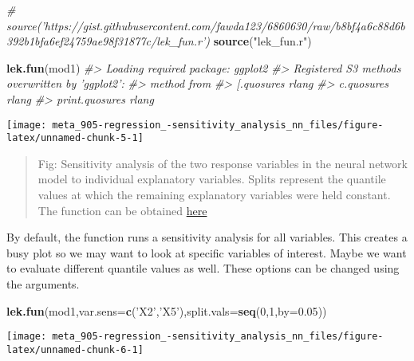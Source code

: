 \documentclass[]{book}
\newenvironment{Shaded}{\begin{snugshade}}{\end{snugshade}}
\newcommand{\CommentTok}[1]{\textcolor[rgb]{0.56,0.35,0.01}{\textit{#1}}}
\newcommand{\DataTypeTok}[1]{\textcolor[rgb]{0.13,0.29,0.53}{#1}}
\newcommand{\DecValTok}[1]{\textcolor[rgb]{0.00,0.00,0.81}{#1}}
\newcommand{\FloatTok}[1]{\textcolor[rgb]{0.00,0.00,0.81}{#1}}
\newcommand{\KeywordTok}[1]{\textcolor[rgb]{0.13,0.29,0.53}{\textbf{#1}}}
\newcommand{\NormalTok}[1]{#1}
\newcommand{\StringTok}[1]{\textcolor[rgb]{0.31,0.60,0.02}{#1}}
\begin{document}
\begin{Shaded}
\begin{Highlighting}[]
\CommentTok{# source('https://gist.githubusercontent.com/fawda123/6860630/raw/b8bf4a6c88d6b392b1bfa6ef24759ae98f31877c/lek_fun.r')}
\KeywordTok{source}\NormalTok{(}\StringTok{"lek_fun.r"}\NormalTok{)}

\KeywordTok{lek.fun}\NormalTok{(mod1)}
\CommentTok{#> Loading required package: ggplot2}
\CommentTok{#> Registered S3 methods overwritten by 'ggplot2':}
\CommentTok{#>   method         from }
\CommentTok{#>   [.quosures     rlang}
\CommentTok{#>   c.quosures     rlang}
\CommentTok{#>   print.quosures rlang}
\end{Highlighting}
\end{Shaded}

\begin{center}\texttt{[image: meta\_905-regression\_-sensitivity\_analysis\_nn\_files/figure-latex/unnamed-chunk-5-1]} \end{center}

\begin{quote}
Fig: Sensitivity analysis of the two response variables in the neural network model to individual explanatory variables. Splits represent the quantile values at which the remaining explanatory variables were held constant. The function can be obtained \href{https://gist.githubusercontent.com/fawda123/6860630/raw/b8bf4a6c88d6b392b1bfa6ef24759ae98f31877c/lek_fun.r}{here}
\end{quote}

By default, the function runs a sensitivity analysis for all variables. This creates a busy plot so we may want to look at specific variables of interest. Maybe we want to evaluate different quantile values as well. These options can be changed using the arguments.

\begin{Shaded}
\begin{Highlighting}[]
\KeywordTok{lek.fun}\NormalTok{(mod1,}\DataTypeTok{var.sens=}\KeywordTok{c}\NormalTok{(}\StringTok{'X2'}\NormalTok{,}\StringTok{'X5'}\NormalTok{),}\DataTypeTok{split.vals=}\KeywordTok{seq}\NormalTok{(}\DecValTok{0}\NormalTok{,}\DecValTok{1}\NormalTok{,}\DataTypeTok{by=}\FloatTok{0.05}\NormalTok{))}
\end{Highlighting}
\end{Shaded}

\begin{center}\texttt{[image: meta\_905-regression\_-sensitivity\_analysis\_nn\_files/figure-latex/unnamed-chunk-6-1]} \end{center}
\end{document}
